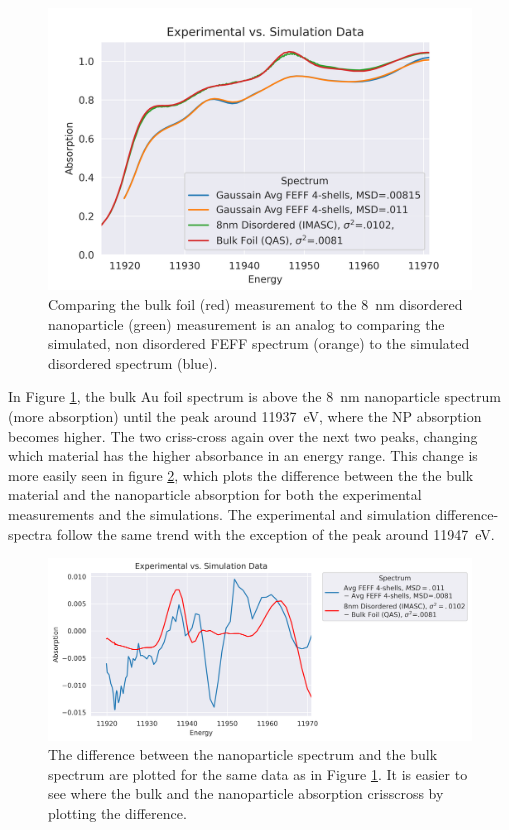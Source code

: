 \begin{figure}[h]
	\centering
	\includegraphics[width=.75\linewidth]{Chapters/Figures/updated_bulk_8nm_disorder_experimental_theory_comparison.png}
	\caption[Simulation vs. Experimental]{Comparing the bulk foil (red) measurement to the 8~nm disordered nanoparticle (green) measurement is an analog to comparing the simulated, non disordered FEFF spectrum (orange) to the simulated disordered spectrum (blue).}
	\label{fig:avg-experimental-vs-simulation}
\end{figure}

In Figure \ref{fig:avg-experimental-vs-simulation}, the bulk Au foil spectrum is above the 8~nm nanoparticle spectrum (more absorption) until the peak around 11937~eV, where the NP absorption becomes higher. The two criss-cross again over the next two peaks, changing which material has the higher absorbance in an energy range. This change is more easily seen in figure \ref{fig:avg-experimential-vs-simulation-difference}, which plots the difference between the the bulk material and the nanoparticle absorption for both the experimental measurements and the simulations. The experimental and simulation difference-spectra follow the same trend with the exception of the peak around 11947~eV.


\begin{figure}[h!]
	\centering
	\includegraphics[width=\linewidth]{Chapters/Figures/experimental_vs_simulation_delta.png}
	\caption[Bulk-nanoparticle difference: Simulation vs. Experimental data]{The difference between the nanoparticle spectrum and the bulk spectrum are plotted for the same data as in Figure \ref{fig:avg-experimental-vs-simulation}. It is easier to see where the bulk and the nanoparticle absorption crisscross by plotting the difference.}
	\label{fig:avg-experimential-vs-simulation-difference}
\end{figure}

